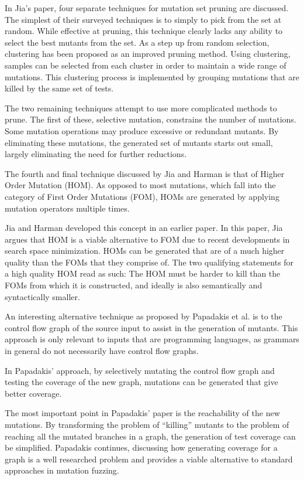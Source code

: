 In Jia's paper, four separate techniques for mutation set pruning are
discussed. The simplest of their surveyed techniques is to simply to
pick from the set at random. While effective at pruning, this
technique clearly lacks any ability to select the best mutants from
the set. As a step up from random selection, clustering has been
proposed as an improved pruning method. Using clustering, samples can
be selected from each cluster in order to maintain a wide range of
mutations. This clustering process is implemented by grouping
mutations that are killed by the same set of tests.

The two remaining techniques attempt to use more complicated methods
to prune. The first of these, selective mutation, constrains the number
of mutations. Some mutation operations may produce excessive or
redundant mutants. By eliminating these mutations, the generated set
of mutants starts out small, largely eliminating the need for further
reductions.

The fourth and final technique discussed  by Jia and Harman is that of
Higher Order Mutation (HOM). As opposed to most mutations, which fall
into the category of First Order Mutations (FOM), HOMs are generated
by applying mutation operators multiple times.

Jia and Harman developed this concept in an earlier paper. \cite{Jia}
In this paper, Jia argues that HOM is a viable alternative to FOM due
to recent developments in search space minimization. HOMs can be
generated that are of a much higher quality than the FOMs that they
comprise of. The two qualifying statements for a high quality HOM read
as such: The HOM must be harder to kill than the FOMs from which it is
constructed, and ideally is also semantically and syntactically
smaller.



An interesting alternative technique as proposed by Papadakis et
al. is to the control flow graph of the source input to assist in the
generation of mutants.\cite{Papadakis2010} This approach is only
relevant to inputs that are programming languages, as grammars in
general do not necessarily have control flow graphs.

In Papadakis' approach, by selectively mutating the control flow graph
and testing the coverage of the new graph, mutations can be generated
that give better coverage.

The most important point in Papadakis' paper is the reachability of
the new mutations. By transforming the problem of ``killing'' mutants
to the problem of reaching all the mutated branches in a graph, the
generation of test coverage can be simplified. Papadakis continues,
discussing how generating coverage for a graph is a well researched
problem and provides a viable alternative to standard approaches in
mutation fuzzing.







